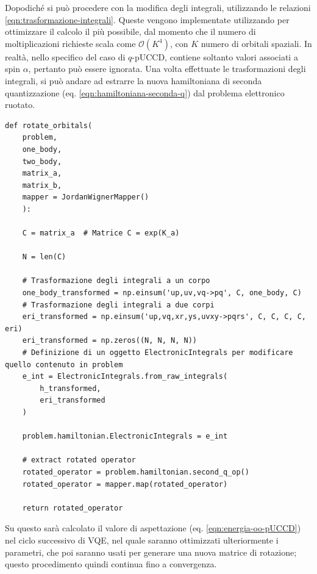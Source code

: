 Dopodiché si può procedere con la modifica degli integrali, utilizzando le relazioni \ref{eqn:trasformazione-integrali}. Queste vengono implementate utilizzando  per ottimizzare il calcolo il più possibile, dal momento che il numero di moltiplicazioni richieste scala come $\mathcal{O}(K^4)$, con $K$ numero di orbitali spaziali. 
In realtà, nello specifico del caso di $q$-pUCCD,  contiene soltanto valori associati a spin $\alpha$, pertanto  può essere ignorata. 
Una volta effettuate le trasformazioni degli integrali, si può andare ad estrarre la nuova hamiltoniana di seconda quantizzazione (eq. \ref{eqn:hamiltoniana-seconda-q}) dal problema elettronico ruotato.

\begin{tcolorbox}[title=Rotazioni orbitali, breakable]
\begin{lstlisting}
def rotate_orbitals(
    problem, 
    one_body, 
    two_body, 
    matrix_a, 
    matrix_b, 
    mapper = JordanWignerMapper()
    ): 

    C = matrix_a  # Matrice C = exp(K_a)

    N = len(C)

    # Trasformazione degli integrali a un corpo
    one_body_transformed = np.einsum('up,uv,vq->pq', C, one_body, C)
    # Trasformazione degli integrali a due corpi
    eri_transformed = np.einsum('up,vq,xr,ys,uvxy->pqrs', C, C, C, C, eri)
    eri_transformed = np.zeros((N, N, N, N))
    # Definizione di un oggetto ElectronicIntegrals per modificare quello contenuto in problem
    e_int = ElectronicIntegrals.from_raw_integrals(
        h_transformed,                                            
        eri_transformed
    )

    problem.hamiltonian.ElectronicIntegrals = e_int

    # extract rotated operator
    rotated_operator = problem.hamiltonian.second_q_op()
    rotated_operator = mapper.map(rotated_operator)

    return rotated_operator
\end{lstlisting}
\vspace{-0.2cm}
\end{tcolorbox}

Su questo  sarà calcolato il valore di aspettazione (eq. \ref{eqn:energia-oo-pUCCD}) nel ciclo successivo di VQE, nel quale saranno ottimizzati ulteriormente i parametri, che poi saranno usati per generare una nuova matrice di rotazione; questo procedimento quindi continua fino a convergenza.

